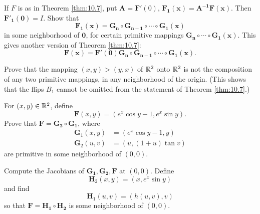 \begin{myexercise}
    \label{ex:10.3}
    \begin{asparaenum}[(a)]
        \item If $F$ is as in Theorem \ref{thm:10.7}, put
        $\mathbf{A} = \mathbf{F}'(0)$,
        $\mathbf{F_{1}(x)} = \mathbf{A^{-1}F(x)}$.
        Then $\mathbf{F'_1(0)}=I$.
        Show that
        \begin{equation*}
            \mathbf{F_1(x) = G_n \circ G_{n-1} \circ \cdots \circ G_1(x)}
        \end{equation*}
        in some neighborhood of $\mathbf{0}$,
        for certain primitive mappings $\mathbf{G_n \circ \cdots \circ G_1(x)}$.
        This gives another version of Theorem \ref{thm:10.7}:
        \begin{equation*}
            \mathbf{F(x) = F'(0) G_n \circ G_{n-1} \circ \cdots \circ G_1(x)}.
        \end{equation*}
        \item Prove that the mapping $(x, y) > (y, x)$ of ${\protect\mathbb R}^2$ onto ${\protect\mathbb R}^2$ is not the composition of any two primitive mappings, in any neighborhood of the origin.
        (This shows that the flips $B_1$ cannot be omitted from the statement of Theorem \ref{thm:10.7}.)
    \end{asparaenum}
\end{myexercise}

\begin{myexercise}
    \label{ex:10.4}
    For $(x,y) \in {\protect\mathbb R}^2$, define
    \begin{equation*}
        \mathbf{F}(x,y) = (e^x \cos y - 1, e^x \sin y).
    \end{equation*}
    Prove that $\mathbf{F = G_2 \circ G_1}$, where
    \begin{align*}
        \mathbf{G}_1 (x,y) & = (e^x \cos y - 1, y) \\
        \mathbf{G}_2 (u,v) & = (u, (1 + u) \tan v)
    \end{align*}
    are primitive in some neighborhood of $(0, 0)$.

    Compute the Jacobians of $\mathbf{G_1, G_2, F}$ at $(0, 0)$.
    Define
    \begin{equation*}
        \mathbf{H}_2 (x,y) = (x, e^x \sin y)
    \end{equation*}
    and find
    \begin{equation*}
        \mathbf{H}_1 (u,v) = (h(u,v), v)
    \end{equation*}
    so that $\mathbf{F = H_1 \circ H_2}$ is some neighborhood of $(0,0)$.
\end{myexercise}


